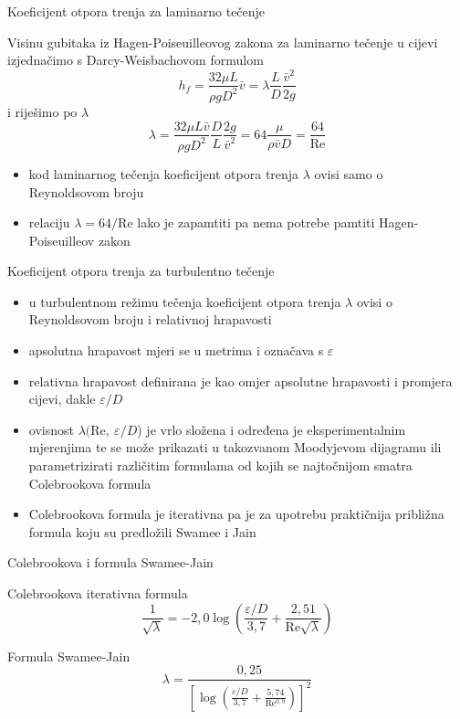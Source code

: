 \documentclass{beamer}
\begin{document}
\begin{frame}{Koeficijent otpora trenja za laminarno tečenje}

Visinu gubitaka iz Hagen-Poiseuilleovog zakona za laminarno tečenje
u cijevi izjednačimo s Darcy-Weisbachovom formulom
\[
h_{f}=\frac{32\mu L}{\rho gD^{2}}\bar{v}=\lambda\frac{L}{D}\frac{\bar{v}^{2}}{2g}
\]
i riješimo po $\lambda$
\[
\lambda=\frac{32\mu L\bar{v}}{\rho gD^{2}}\frac{D}{L}\frac{2g}{\bar{v}^{2}}=64\frac{\mu}{\rho\bar{v}D}=\frac{64}{\mathrm{Re}}
\]

\begin{block}{}

\begin{itemize}
\item kod laminarnog tečenja koeficijent otpora trenja $\lambda$ ovisi
samo o Reynoldsovom broju
\item relaciju $\lambda=64/\mathrm{Re}$ lako je zapamtiti pa nema potrebe
pamtiti Hagen-Poiseuilleov zakon
\end{itemize}
\end{block}
\end{frame}

\begin{frame}{Koeficijent otpora trenja za turbulentno tečenje}

\begin{itemize}
\item u turbulentnom režimu tečenja koeficijent otpora trenja $\lambda$
ovisi o Reynoldsovom broju i \alert{relativnoj hrapavosti}
\item \alert{apsolutna hrapavost} mjeri se u metrima i označava s $\varepsilon$
\item \alert{relativna hrapavost} definirana je kao omjer apsolutne hrapavosti
i promjera cijevi, dakle $\varepsilon/D$
\item ovisnost $\lambda(\mathrm{Re},\:\varepsilon/D$) je vrlo složena i
određena je eksperimentalnim mjerenjima te se može prikazati u takozvanom
Moodyjevom dijagramu ili parametrizirati različitim formulama od kojih
se najtočnijom smatra Colebrookova formula
\item Colebrookova formula je iterativna pa je za upotrebu praktičnija približna
formula koju su predložili Swamee i Jain
\end{itemize}
\end{frame}

\begin{frame}{Colebrookova i formula Swamee-Jain}

Colebrookova iterativna formula
\[
\frac{1}{\sqrt{\lambda}}=-2,0\log\left(\frac{\varepsilon/D}{3,7}+\frac{2,51}{\mathrm{Re}\sqrt{\lambda}}\right)
\]

\vfill{}

Formula Swamee-Jain
\[
\lambda=\frac{0,25}{\left[\log\left(\frac{\varepsilon/D}{3,7}+\frac{5,74}{\mathrm{Re^{0,9}}}\right)\right]^{2}}
\]

\end{frame}
\end{document}
